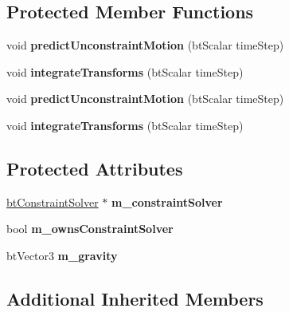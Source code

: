\subsection*{Protected Member Functions}
\begin{DoxyCompactItemize}
\item 
\mbox{\label{classbtSimpleDynamicsWorld_ace01d5de5f2772b7e72fddf3a240b38a}} 
void {\bfseries predict\+Unconstraint\+Motion} (bt\+Scalar time\+Step)
\item 
\mbox{\label{classbtSimpleDynamicsWorld_a9ff7980b0472d3ed5dadc5798d696b7d}} 
void {\bfseries integrate\+Transforms} (bt\+Scalar time\+Step)
\item 
\mbox{\label{classbtSimpleDynamicsWorld_ace01d5de5f2772b7e72fddf3a240b38a}} 
void {\bfseries predict\+Unconstraint\+Motion} (bt\+Scalar time\+Step)
\item 
\mbox{\label{classbtSimpleDynamicsWorld_a9ff7980b0472d3ed5dadc5798d696b7d}} 
void {\bfseries integrate\+Transforms} (bt\+Scalar time\+Step)
\end{DoxyCompactItemize}
\subsection*{Protected Attributes}
\begin{DoxyCompactItemize}
\item 
\mbox{\label{classbtSimpleDynamicsWorld_a2537c41c6c97707ddcd511d726fc16fe}} 
\hyperlink{classbtConstraintSolver}{bt\+Constraint\+Solver} $\ast$ {\bfseries m\+\_\+constraint\+Solver}
\item 
\mbox{\label{classbtSimpleDynamicsWorld_a30cbc96e70f35e7569d67518fba53bd3}} 
bool {\bfseries m\+\_\+owns\+Constraint\+Solver}
\item 
\mbox{\label{classbtSimpleDynamicsWorld_af9c01a665a220de5fe4d988d6160297b}} 
bt\+Vector3 {\bfseries m\+\_\+gravity}
\end{DoxyCompactItemize}
\subsection*{Additional Inherited Members}



